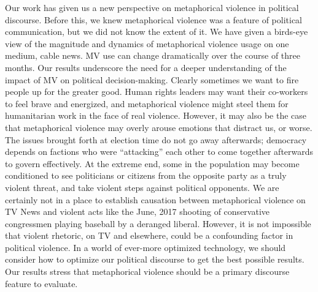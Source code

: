 Our work has given us a new perspective on metaphorical violence in political
discourse. Before this, we knew metaphorical violence was a feature of 
political communication, but we did not know the extent of it. We have given 
a birds-eye view of the magnitude and dynamics of metaphorical violence
usage on one medium, cable news.
MV use can change dramatically over the course of three months. 
Our results 
underscore the need for a deeper understanding of the impact of MV on 
political decision-making. Clearly sometimes we want to fire people up for
the greater good.
Human rights leaders may want their co-workers to feel brave
and energized, and metaphorical violence might steel them for
humanitarian work in the face of real violence.
However, it may also be the case that metaphorical violence may overly
arouse emotions that distract us, or worse. The
issues brought forth at election time do not go away afterwards;
democracy depends on factions who were ``attacking'' each other to 
come together afterwards to govern effectively. At the extreme end,
some in the population may become conditioned to see politicians or 
citizens from the opposite party as a truly violent threat, and take
violent steps against political opponents. We are certainly not in a place to
establish causation between metaphorical violence on TV News and violent
acts like the June, 2017 shooting of conservative congressmen playing baseball
by a deranged liberal. However, it is not impossible that violent
rhetoric, on TV and elsewhere, could be a confounding
factor in political violence. In a world of ever-more optimized
technology, we should consider how to optimize our political discourse
to get the best possible results. Our results stress that metaphorical 
violence should be a primary discourse feature to evaluate.
